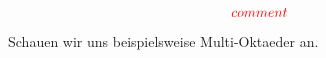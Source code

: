 \documentclass[12pt,titlepage,twoside,cleardoublepage]{article}
\theoremstyle{nummermitklammern}
\numberwithin{equation}{section}
\begin{document}

\[
\textcolor{red}{comment}
\]
Schauen wir uns beispielsweise Multi-Oktaeder an.
\end{document}

